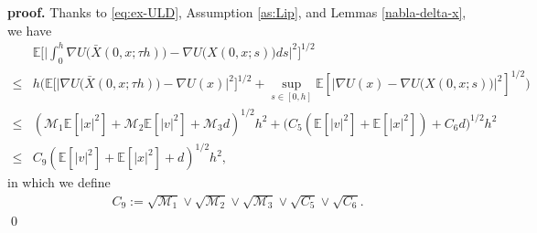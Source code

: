 \documentclass[12pt]{article}
\numberwithin{equation}{section}
\renewenvironment{proof}%
  {\begin{trivlist}%
   \item[]\ignorespaces}%
  {\qed\end{trivlist}}
\newcommand{\E}{\mathbb{E}}
\begin{document}
\begin{proof}
    \textbf{proof.}
    Thanks to \eqref{eq:ex-ULD}, Assumption \ref{as:Lip}, and Lemmas \ref{nabla-delta-x}, we have
    \begin{align}
        &\mathbb{E}\Big[\Big|\int^h_0\nabla U\big(\bar{X}(0,x;\tau h)\big)-\nabla U\big(X(0,x;s)\big)ds\Big|^2\Big]^{1/2} \nonumber\\
        \leq&
        h\Big(\mathbb{E}\big[\big|\nabla U\big(\bar{X}(0,x;\tau h)\big)-\nabla U(x)\big|^2\big]^{1/2}+\sup_{s\in [0,h]}\mathbb{E}[|\nabla U(x)-\nabla U\big(X(0,x;s)\big)|^2]^{1/2}\Big)\nonumber\\
        \leq &        (\mathcal{M}_1\E[|x|^2]+\mathcal{M}_2\E[|v|^2]+\mathcal{M}_3d)^{1/2}h^2
        +
        \big(C_5(\mathbb{E}[|v|^2]+\mathbb{E}[|x|^2])+C_6d\big)^{1/2}h^2 \nonumber\\
        \leq &
        C_9(\mathbb{E}[|v|^2]+\mathbb{E}[|x|^2]+d)^{1/2}h^2,
    \end{align}
    in which we define 
    \begin{align}
        C_{9}:=\sqrt{\mathcal{M}_1}\vee \sqrt{\mathcal{M}_2}\vee \sqrt{\mathcal{M}_3}\vee \sqrt{C_5}\vee \sqrt{C_6}.
    \end{align}
\end{proof}
\fi
\end{document}
